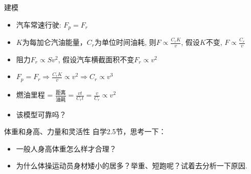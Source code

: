 \documentclass[mathserif]{beamer}
\begin{document}
\begin{frame}{建模}

  \begin{itemize}
  \item 汽车常速行驶: $F_p = F_r$
  \item $K$为每加仑汽油能量，$C_r$为单位时间油耗, 则$F \propto \frac{C_rK}{v}$, 假设$K$不变, $F \propto \frac{C_r}{v}$
  \item 阻力$F_r \propto Sv^2$, 假设汽车横截面积不变$F_r \propto v^2$
  \item $F_p = F_r \Rightarrow \frac{C_rK}{v} \propto v^2 \Rightarrow C_r \propto v^3$
  \item 燃油里程 = $\frac{\text{距离}}{\text{油耗}} = \frac{vt}{C_rt}=\frac{v}{C_r}\propto v^2$
  \item 该模型可靠吗？
  \end{itemize}
  
\end{frame}

\begin{frame}{体重和身高、力量和灵活性}
  自学2.5节，思考一下：

  \begin{itemize}
  \item 一般人身高体重怎么样才合理？
  \item 为什么体操运动员身材矮小的居多？举重、短跑呢？试着去分析一下原因.
  \end{itemize}

\end{frame}
\end{document}

